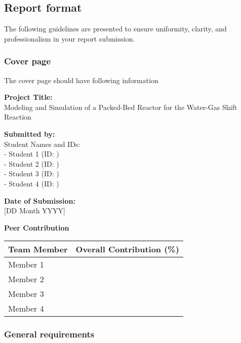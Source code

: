 \documentclass[
  12pt,
  a4paperpaper,
  DIV=11,
  numbers=noendperiod]{scrartcl}
\begin{document}
\subsection{Report format}\label{report-format}

The following guidelines are presented to ensure uniformity, clarity,
and professionalism in your report submission.

\subsubsection{Cover page}\label{cover-page}

The cover page should have following information

\textbf{Project Title:}\\
Modeling and Simulation of a Packed-Bed Reactor for the Water-Gas Shift
Reaction

\textbf{Submitted by:}\\
Student Names and IDs:\\
- Student 1 (ID: )\\
- Student 2 (ID: )\\
- Student 3 (ID: )\\
- Student 4 (ID: )

\textbf{Date of Submission:}\\
{[}DD Month YYYY{]}

\textbf{Peer Contribution}

\begin{longtable}[]{@{}ll@{}}
\toprule\noalign{}
Team Member & Overall Contribution (\%) \\
\midrule\noalign{}
\endhead
\bottomrule\noalign{}
\endlastfoot
Member 1 & \\
Member 2 & \\
Member 3 & \\
Member 4 & \\
\end{longtable}

\subsubsection{General requirements}\label{general-requirements}
\end{document}
